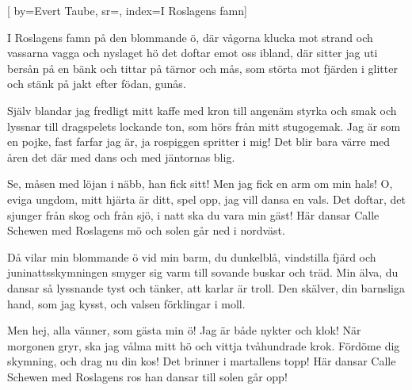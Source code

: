 


[ 	%
	by={Evert Taube},	%
	sr={},
	index={I Roslagens famn}]		%
	
\beginverse*		%
I Roslagens famn på den blommande ö,
där vågorna klucka mot strand
och vassarna vagga och nyslaget hö
det doftar emot oss ibland,
där sitter jag uti bersån på en bänk
och tittar på tärnor och mås,
som störta mot fjärden i glitter och stänk
på jakt efter födan, gunås.
\endverse			%

\beginverse*		%
Själv blandar jag fredligt mitt kaffe med kron
till angenäm styrka och smak
och lyssnar till dragspelets lockande ton,
som hörs från mitt stugogemak.
Jag är som en pojke, fast farfar jag är,
ja rospiggen spritter i mig!
Det blir bara värre med åren det där
med dans och med jäntornas blig.
\endverse			%

\beginverse*		%
Se, måsen med löjan i näbb, han fick sitt!
Men jag fick en arm om min hals!
O, eviga ungdom, mitt hjärta är ditt,
spel opp, jag vill dansa en vals.
Det doftar, det sjunger från skog och från sjö,
i natt ska du vara min gäst!
Här dansar Calle Schewen med Roslagens mö
och solen går ned i nordväst.
\endverse			%

\beginverse*		%
Då vilar min blommande ö vid min barm,
du dunkelblå, vindstilla fjärd
och juninattsskymningen smyger sig varm
till sovande buskar och träd.
Min älva, du dansar så lyssnande tyst
och tänker, att karlar är troll.
Den skälver, din barnsliga hand, som jag kysst,
och valsen förklingar i moll.
\endverse			%

\beginverse*		%
Men hej, alla vänner, som gästa min ö!
Jag är både nykter och klok!
När morgonen gryr, ska jag vålma mitt hö
och vittja tvåhundrade krok.
Fördöme dig skymning, och drag nu din kos!
Det brinner i martallens topp!
Här dansar Calle Schewen med Roslagens ros
han dansar till solen går opp!
\endverse			%
\endsong			%
